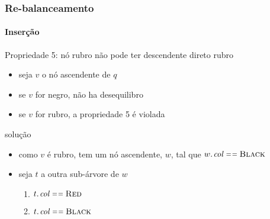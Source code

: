 \documentclass{beamer}
\begin{document}
\begin{frame}

\frametitle{Re-balanceamento}
\framesubtitle{Inserção}

Propriedade 5: nó rubro não pode ter descendente direto rubro

\begin{itemize}

\item seja $v$ o nó ascendente de $q$

\item se $v$ for negro, não ha desequilibro

\item se $v$ for rubro, a propriedade 5 é violada

\end{itemize}

\pause

\alert{solução}

\begin{itemize}

\item como $v$ é rubro, tem um nó ascendente, $w$, tal que $\attrib{w}{col} \isequal \const{Black}$

\item seja $t$ a outra sub-árvore de $w$

\begin{enumerate}

\item $\attrib{t}{col} \isequal \const{Red}$

\item $\attrib{t}{col} \isequal \const{Black}$

\end{enumerate}

\end{itemize}

\end{frame}
\end{document}
